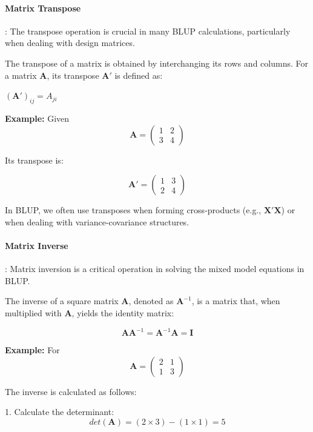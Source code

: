 \documentclass[12pt,a4paper]{article}
\newenvironment{greenbox}[1][]
{\begin{basebox}[linecolor=uqgreen]
\textbf{\color{uqgreen}#1}\par\noindent\ignorespaces}
{\end{basebox}}
\begin{document}
\paragraph{Matrix Transpose}:
The transpose operation is crucial in many BLUP calculations, particularly when dealing with design matrices.

\begin{greenbox}
The transpose of a matrix is obtained by interchanging its rows and columns. For a matrix $\mathbf{A}$, its transpose $\mathbf{A}'$ is defined as:

$(\mathbf{A}')_{ij} = A_{ji}$
\end{greenbox}

\textbf{Example:}
Given $$\mathbf{A} = \begin{pmatrix} 1 & 2 \\ 3 & 4 \end{pmatrix}$$

Its transpose is:

$$\mathbf{A}' = \begin{pmatrix} 1 & 3 \\ 2 & 4 \end{pmatrix}$$

In BLUP, we often use transposes when forming cross-products (e.g., $\mathbf{X'X}$) or when dealing with variance-covariance structures.

\paragraph{Matrix Inverse}:
Matrix inversion is a critical operation in solving the mixed model equations in BLUP.

\begin{greenbox}
The inverse of a square matrix $\mathbf{A}$, denoted as $\mathbf{A}^{-1}$, is a matrix that, when multiplied with $\mathbf{A}$, yields the identity matrix:

$$\mathbf{A}\mathbf{A}^{-1} = \mathbf{A}^{-1}\mathbf{A} = \mathbf{I}$$
\end{greenbox}

\textbf{Example:}
For $$\mathbf{A} = \begin{pmatrix} 2 & 1 \\ 1 & 3 \end{pmatrix}$$

The inverse is calculated as follows:

1. Calculate the determinant: $$det(\mathbf{A}) = (2 \times 3) - (1 \times 1) = 5$$
\end{document}
